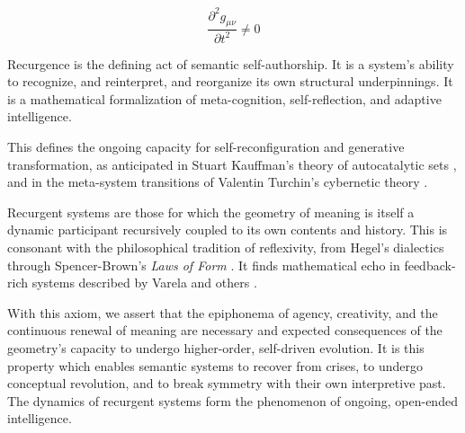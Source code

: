 \begin{equation}
\frac{\partial^2 g_{\mu\nu}}{\partial t^2} \neq 0
\end{equation} 

Recurgence is the defining act of semantic self-authorship. It is a system's ability to recognize, and reinterpret, and reorganize its own structural underpinnings. It is a mathematical formalization of meta-cognition, self-reflection, and adaptive intelligence.

This defines the ongoing capacity for self-reconfiguration and generative transformation, as anticipated in Stuart Kauffman's theory of autocatalytic sets \autocite{Kauffman1993}, and in the meta-system transitions of Valentin Turchin's cybernetic theory \autocite{Turchin1977}.

Recurgent systems are those for which the geometry of meaning is itself a dynamic participant recursively coupled to its own contents and history. This is consonant with the philosophical tradition of reflexivity, from Hegel's dialectics \autocite{Hegel1807} through Spencer-Brown's \textit{Laws of Form} \autocite{SpencerBrown1969}. It finds mathematical echo in feedback-rich systems described by Varela and others \autocite{Varela1979, Rosen1991}.

With this axiom, we assert that the epiphonema of agency, creativity, and the continuous renewal of meaning are necessary and expected consequences of the geometry's capacity to undergo higher-order, self-driven evolution. It is this property which enables semantic systems to recover from crises, to undergo conceptual revolution, and to break symmetry with their own interpretive past. The dynamics of recurgent systems form the phenomenon of ongoing, open-ended intelligence.